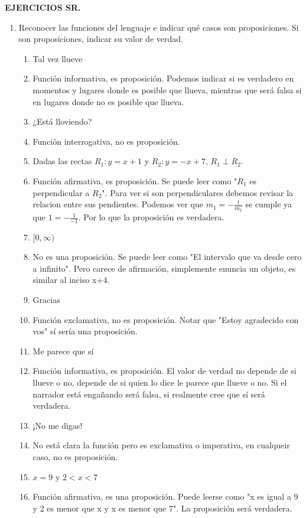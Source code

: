 \documentclass[a4paper]{article}
\newcommand{\answer}{\item[**]}
\newcommand{\exercise}{\item}
\begin{document}
\textbf{EJERCICIOS SR.}
\begin{enumerate}[resume]

	\exercise Reconocer las funciones del lenguaje e indicar qué casos son proposiciones. Si son proposiciones, indicar su valor de verdad.
	\begin{multicols}{2}
	\begin{enumerate} [label=(\alph*)]

		\item Tal vez llueve
		\answer Función informativa, es proposición. Podemos indicar si es verdadero en momentos y lugares donde es posible que llueva, mientras que será falsa si en lugares donde no es posible que llueva.

		\item ¿Está lloviendo?
		\answer Función interrogativa, no es proposición.

		\item Dadas las rectas $R_1: y=x+1$ y $R_2: y=-x+7$, $R_1 \perp R_2$.
		\answer Función afirmativa, es proposición. Se puede leer como "$R_1$ es perpendicular a $R_2$". Para ver si son perpendiculares debemos revisar la relacion entre sus pendientes. Podemos ver que $m_1 = -\frac{1}{m_2}$ se cumple ya que $1 = -\frac{1}{-1}$. Por lo que la proposición es verdadera.

		\item $ [ 0, \infty )$
		\answer No es una proposición. Se puede leer como "El intervalo que va desde cero a infinito". Pero carece de afirmación, simplemente enuncia un objeto, es similar al inciso x+4.

		\item Gracias
		\answer Función exclamativa, no es proposición. Notar que "Estoy agradecido con vos" sí sería una proposición.

		\item Me parece que sí 
		\answer Función informativa, es proposición. El valor de verdad no depende de si llueve o no, depende de si quien lo dice le parece que llueve o no. Si el narrador está engañando será falsa, si realmente cree que sí será verdadera.

		\item ¡No me digas!
		\answer No está clara la función pero es exclamativa o imperativa, en cualqueir caso, no es proposición.

		\item $x=9$ y $2 < x < 7$
		\answer Función afirmativa, es una proposición. Puede leerse como "x es igual a 9 y 2 es menor que x y x es menor que 7". La proposición será verdadera.


\end{enumerate}
\end{multicols}
\end{enumerate}
\end{document}
